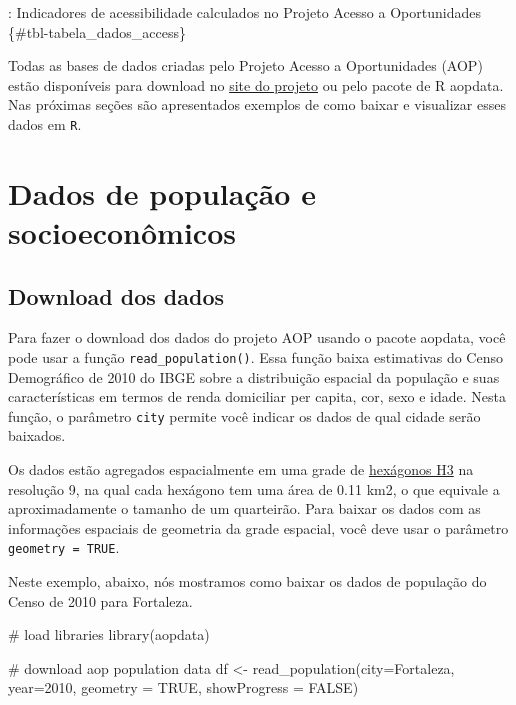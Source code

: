 \documentclass[
  letterpaper,
  DIV=11,
  numbers=noendperiod]{scrreprt}
\newenvironment{Shaded}{\begin{snugshade}}{\end{snugshade}}
\newcommand{\AttributeTok}[1]{\textcolor[rgb]{0.40,0.45,0.13}{#1}}
\newcommand{\CommentTok}[1]{\textcolor[rgb]{0.37,0.37,0.37}{#1}}
\newcommand{\ConstantTok}[1]{\textcolor[rgb]{0.56,0.35,0.01}{#1}}
\newcommand{\DecValTok}[1]{\textcolor[rgb]{0.68,0.00,0.00}{#1}}
\newcommand{\FunctionTok}[1]{\textcolor[rgb]{0.28,0.35,0.67}{#1}}
\newcommand{\NormalTok}[1]{\textcolor[rgb]{0.00,0.23,0.31}{#1}}
\newcommand{\OtherTok}[1]{\textcolor[rgb]{0.00,0.23,0.31}{#1}}
\newcommand{\StringTok}[1]{\textcolor[rgb]{0.13,0.47,0.30}{#1}}
\begin{document}
: Indicadores de acessibilidade calculados no Projeto Acesso a
Oportunidades \{\#tbl-tabela\_dados\_access\}

Todas as bases de dados criadas pelo Projeto Acesso a Oportunidades
(AOP) estão disponíveis para download no
\href{https://www.ipea.gov.br/acessooportunidades/dados/}{site do
projeto} ou pelo pacote de R aopdata. Nas próximas seções são
apresentados exemplos de como baixar e visualizar esses dados em
\texttt{R}.

\hypertarget{dados-de-populauxe7uxe3o-e-socioeconuxf4micos}{%
\chapter{Dados de população e
socioeconômicos}\label{dados-de-populauxe7uxe3o-e-socioeconuxf4micos}}

\hypertarget{download-dos-dados}{%
\section{Download dos dados}\label{download-dos-dados}}

Para fazer o download dos dados do projeto AOP usando o pacote aopdata,
você pode usar a função \texttt{read\_population()}. Essa função baixa
estimativas do Censo Demográfico de 2010 do IBGE sobre a distribuição
espacial da população e suas características em termos de renda
domiciliar per capita, cor, sexo e idade. Nesta função, o parâmetro
\texttt{city} permite você indicar os dados de qual cidade serão
baixados.

Os dados estão agregados espacialmente em uma grade de
\href{https://h3geo.org/}{hexágonos H3} na resolução 9, na qual cada
hexágono tem uma área de 0.11 km2, o que equivale a aproximadamente o
tamanho de um quarteirão. Para baixar os dados com as informações
espaciais de geometria da grade espacial, você deve usar o parâmetro
\texttt{geometry\ =\ TRUE}.

Neste exemplo, abaixo, nós mostramos como baixar os dados de população
do Censo de 2010 para Fortaleza.

\begin{Shaded}
\begin{Highlighting}[]
\CommentTok{\# load libraries}
\FunctionTok{library}\NormalTok{(aopdata)}

\CommentTok{\# download aop population data}
\NormalTok{df }\OtherTok{\textless{}{-}} \FunctionTok{read\_population}\NormalTok{(}\AttributeTok{city=}\StringTok{\textquotesingle{}Fortaleza\textquotesingle{}}\NormalTok{,}
                      \AttributeTok{year=}\DecValTok{2010}\NormalTok{,}
                      \AttributeTok{geometry =} \ConstantTok{TRUE}\NormalTok{,}
                      \AttributeTok{showProgress =} \ConstantTok{FALSE}\NormalTok{)}
\end{Highlighting}
\end{Shaded}
\end{document}

